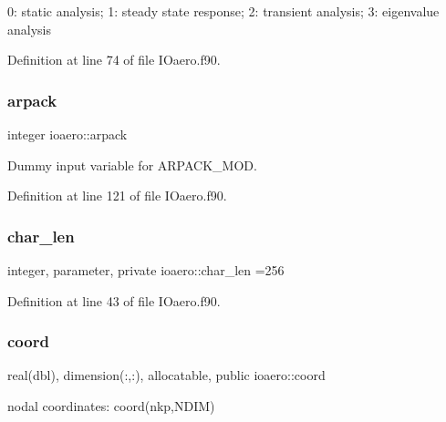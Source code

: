 0\+: static analysis; 1\+: steady state response; 2\+: transient analysis; 3\+: eigenvalue analysis 



Definition at line 74 of file I\+Oaero.\+f90.

\mbox{\label{namespaceioaero_a02839259538f3d7e305ebe79cb43d2c4}} 
\subsubsection{\texorpdfstring{arpack}{arpack}}
{\footnotesize\ttfamily integer ioaero\+::arpack\hspace{0.3cm}{\ttfamily [private]}}



Dummy input variable for A\+R\+P\+A\+C\+K\+\_\+\+M\+OD. 



Definition at line 121 of file I\+Oaero.\+f90.

\mbox{\label{namespaceioaero_acd6bdfdcfd986fd1c26261e5996e3b03}} 
\subsubsection{\texorpdfstring{char\+\_\+len}{char\_len}}
{\footnotesize\ttfamily integer, parameter, private ioaero\+::char\+\_\+len =256\hspace{0.3cm}{\ttfamily [private]}}



Definition at line 43 of file I\+Oaero.\+f90.

\mbox{\label{namespaceioaero_ad67cddc00712c4d5a6d4008b2fe6c452}} 
\subsubsection{\texorpdfstring{coord}{coord}}
{\footnotesize\ttfamily real(dbl), dimension(\+:,\+:), allocatable, public ioaero\+::coord}



nodal coordinates\+: coord(nkp,\+N\+D\+I\+M) 



